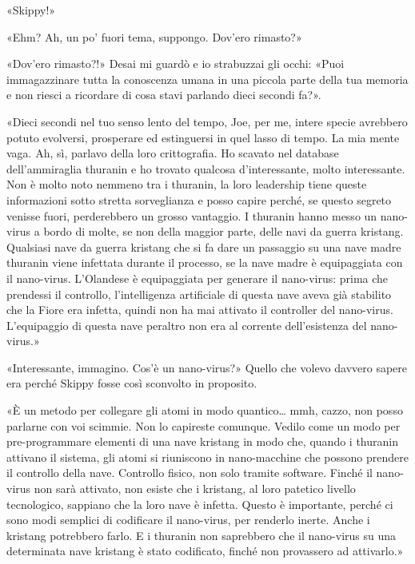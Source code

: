 «Skippy!»

«Ehm? Ah, un po' fuori tema, suppongo. Dov'ero rimasto?»

«Dov'ero rimasto?!» Desai mi guardò e io strabuzzai gli occhi: «Puoi
immagazzinare tutta la conoscenza umana in una piccola parte della tua
memoria e non riesci a ricordare di cosa stavi parlando dieci secondi
fa?».

«Dieci secondi nel tuo senso lento del tempo, Joe, per me, intere specie
avrebbero potuto evolversi, prosperare ed estinguersi in quel lasso di
tempo. La mia mente vaga. Ah, sì, parlavo della loro crittografia. Ho
scavato nel database dell'ammiraglia thuranin e ho trovato qualcosa
d'interessante, molto interessante. Non è molto noto nemmeno tra i
thuranin, la loro leadership tiene queste informazioni sotto stretta
sorveglianza e posso capire perché, se questo segreto venisse fuori,
perderebbero un grosso vantaggio. I thuranin hanno messo un nano-virus a
bordo di molte, se non della maggior parte, delle navi da guerra
kristang. Qualsiasi nave da guerra kristang che si fa dare un passaggio
su una nave madre thuranin viene infettata durante il processo, se la
nave madre è equipaggiata con il nano-virus. L'Olandese è equipaggiata
per generare il nano-virus: prima che prendessi il controllo,
l'intelligenza artificiale di questa nave aveva già stabilito che la
Fiore era infetta, quindi non ha mai attivato il controller del
nano-virus. L'equipaggio di questa nave peraltro non era al corrente
dell'esistenza del nano-virus.»

«Interessante, immagino. Cos'è un nano-virus?» Quello che volevo davvero
sapere era perché Skippy fosse così sconvolto in proposito.

«È un metodo per collegare gli atomi in modo quantico\ldots{} mmh,
cazzo, non posso parlarne con voi scimmie. Non lo capireste comunque.
Vedilo come un modo per pre-programmare elementi di una nave kristang in
modo che, quando i thuranin attivano il sistema, gli atomi si riuniscono
in nano-macchine che possono prendere il controllo della nave. Controllo
fisico, non solo tramite software. Finché il nano-virus non sarà
attivato, non esiste che i kristang, al loro patetico livello
tecnologico, sappiano che la loro nave è infetta. Questo è importante,
perché ci sono modi semplici di codificare il nano-virus, per renderlo
inerte. Anche i kristang potrebbero farlo. E i thuranin non saprebbero
che il nano-virus su una determinata nave kristang è stato codificato,
finché non provassero ad attivarlo.»

